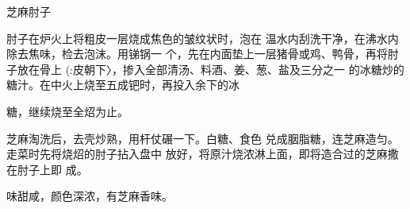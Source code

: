 \begin{recipe}{芝麻肘子}

\ingredients



\cooking

\step 肘子在炉火上将粗皮一层烧成焦色的皱纹状时，泡在 温水内刮洗干净，在沸水内除去焦味，检去泡沫。用锑锅一 个，先在内面垫上一层猪骨或鸡、鸭骨，再将肘子放在骨上 (:皮朝下〉，掺入全部清汤、料酒、姜、葱、盐及三分之一 的冰糖炒的糖汁。在中火上烧至五成钯时，再投入余下的冰

糖，继续烧至全炤为止。

\step 芝麻淘洗后，去壳炒熟，用杆仗碾一下。白糖、食色 兑成胭脂糖，连芝麻造匀。走菜时先将烧炤的肘子拈入盘中 放好，将原汁烧浓淋上面，即将造合过的芝麻撒在肘子上即 成。

\notes

味甜咸，颜色深浓，有芝麻香味。

\end{recipe}


